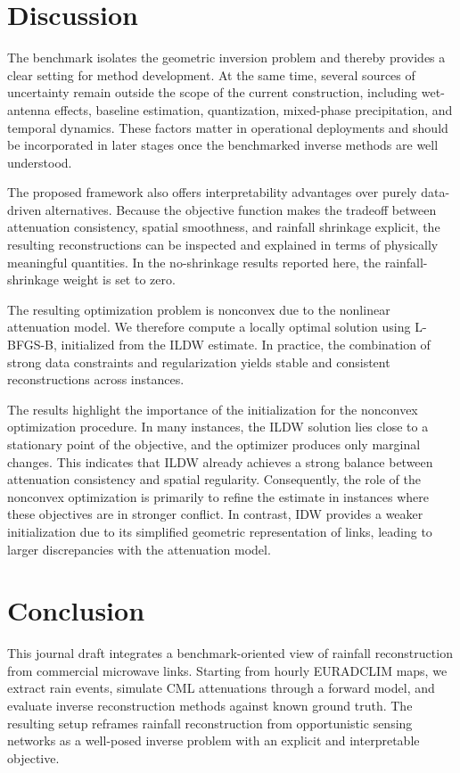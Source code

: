 \documentclass[a4paper,fleqn]{cas-sc}
\begin{document}
\section{Discussion}
The benchmark isolates the geometric inversion problem and thereby provides a clear setting for method development. At the same time, several sources of uncertainty remain outside the scope of the current construction, including wet-antenna effects, baseline estimation, quantization, mixed-phase precipitation, and temporal dynamics. These factors matter in operational deployments and should be incorporated in later stages once the benchmarked inverse methods are well understood.

The proposed framework also offers interpretability advantages over purely data-driven alternatives. Because the objective function makes the tradeoff between attenuation consistency, spatial smoothness, and rainfall shrinkage explicit, the resulting reconstructions can be inspected and explained in terms of physically meaningful quantities. In the no-shrinkage results reported here, the rainfall-shrinkage weight is set to zero.


The resulting optimization problem is nonconvex due to the nonlinear attenuation model. We therefore compute a locally optimal solution using L-BFGS-B, initialized from the ILDW estimate. In practice, the combination of strong data constraints and regularization yields stable and consistent reconstructions across instances.

The results highlight the importance of the initialization for the nonconvex optimization procedure. In many instances, the ILDW solution lies close to a stationary point of the objective, and the optimizer produces only marginal changes. This indicates that ILDW already achieves a strong balance between attenuation consistency and spatial regularity. Consequently, the role of the nonconvex optimization is primarily to refine the estimate in instances where these objectives are in stronger conflict. In contrast, IDW provides a weaker initialization due to its simplified geometric representation of links, leading to larger discrepancies with the attenuation model.
\section{Conclusion}
This journal draft integrates a benchmark-oriented view of rainfall reconstruction from commercial microwave links. Starting from hourly EURADCLIM maps, we extract rain events, simulate CML attenuations through a forward model, and evaluate inverse reconstruction methods against known ground truth. The resulting setup reframes rainfall reconstruction from opportunistic sensing networks as a well-posed inverse problem with an explicit and interpretable objective.
\end{document}
